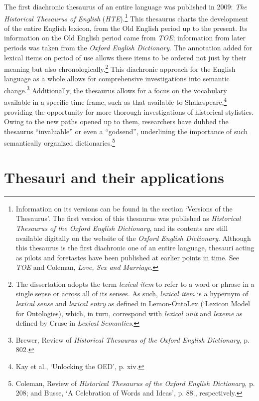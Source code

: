The first diachronic thesaurus of an entire language was published in 2009: \textit{The Historical Thesaurus of English} (\textit{HTE}).\footnote{Information on its versions can be found in the section `Versions of the Thesaurus'. The first version of this thesaurus was published as \textit{Historical Thesaurus of the Oxford English Dictionary}, and its contents are still available digitally on the website of the \textit{Oxford English Dictionary}. Although this thesaurus is the first diachronic one of an entire language, thesauri acting as pilots and foretastes have been published at earlier points in time. See \textit{TOE} and Coleman, \textit{Love, Sex and Marriage}.} This thesaurus charts the development of the entire English lexicon, from the Old English period up to the present. Its information on the Old English period came from \textit{TOE}; information from later periods was taken from the \textit{Oxford English Dictionary}. The annotation added for lexical items on period of use allows these items to be ordered not just by their meaning but also chronologically.\footnote{The dissertation adopts the term \textit{lexical item} to refer to a word or phrase in a single sense or across all of its senses. As such, \textit{lexical item} is a hypernym of \textit{lexical sense} and \textit{lexical entry} as defined in Lemon-OntoLex (`Lexicon Model for Ontologies), which, in turn, correspond with \textit{lexical unit} and \textit{lexeme} as defined by Cruse in \textit{Lexical Semantics}.} This diachronic approach for the English language as a whole allows for comprehensive investigations into semantic change.\footnote{Brewer, Review of \textit{Historical Thesaurus of the Oxford English Dictionary}, p. 802.} Additionally, the thesaurus allows for a focus on the vocabulary available in a specific time frame, such as that available to Shakespeare,\footnote{Kay et al., `Unlocking the OED', p. xiv.} providing the opportunity for more thorough investigations of historical stylistics. Owing to the new paths opened up to them, researchers have dubbed the thesaurus ``invaluable'' or even a ``godsend'', underlining the importance of such semantically organized dictionaries.\footnote{Coleman, Review of \textit{Historical Thesaurus of the Oxford English Dictionary}, p. 208; and Busse, `A Celebration of Words and Ideas', p. 88., respectively.}


\section{Thesauri and their applications}
\label{sect:Introduction:ThesaurusUses}

